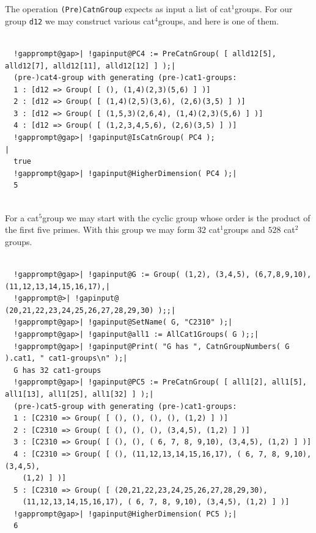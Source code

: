 \documentclass[a4paper,11pt]{report}
\begin{document}
{{{ The operation \texttt{(Pre)CatnGroup} expects as input a list of cat$^1$\texttt{}groups. For our group \texttt{d12} we may construct various cat$^4$\texttt{}groups, and here is one of them. 

 }

 

 
\begin{Verbatim}[commandchars=!@|,fontsize=\small,frame=single,label=Example]
  
  !gapprompt@gap>| !gapinput@PC4 := PreCatnGroup( [ alld12[5], alld12[7], alld12[11], alld12[12] ] );|
  (pre-)cat4-group with generating (pre-)cat1-groups:
  1 : [d12 => Group( [ (), (1,4)(2,3)(5,6) ] )]
  2 : [d12 => Group( [ (1,4)(2,5)(3,6), (2,6)(3,5) ] )]
  3 : [d12 => Group( [ (1,5,3)(2,6,4), (1,4)(2,3)(5,6) ] )]
  4 : [d12 => Group( [ (1,2,3,4,5,6), (2,6)(3,5) ] )]
  !gapprompt@gap>| !gapinput@IsCatnGroup( PC4 );                                             |
  true
  !gapprompt@gap>| !gapinput@HigherDimension( PC4 );|
  5
  
\end{Verbatim}
 For a cat$^5$\texttt{}group we may start with the cyclic group whose order is
the product of the first five primes. With this group we may form $32$ cat$^1$\texttt{}groups and $528$ cat$^2$\texttt{}groups. 

 
\begin{Verbatim}[commandchars=!@|,fontsize=\small,frame=single,label=Example]
  
  !gapprompt@gap>| !gapinput@G := Group( (1,2), (3,4,5), (6,7,8,9,10), (11,12,13,14,15,16,17),|
  !gapprompt@>| !gapinput@               (20,21,22,23,24,25,26,27,28,29,30) );;|
  !gapprompt@gap>| !gapinput@SetName( G, "C2310" );|
  !gapprompt@gap>| !gapinput@all1 := AllCat1Groups( G );;|
  !gapprompt@gap>| !gapinput@Print( "G has ", CatnGroupNumbers( G ).cat1, " cat1-groups\n" );|
  G has 32 cat1-groups
  !gapprompt@gap>| !gapinput@PC5 := PreCatnGroup( [ all1[2], all1[5], all1[13], all1[25], all1[32] ] );|
  (pre-)cat5-group with generating (pre-)cat1-groups:
  1 : [C2310 => Group( [ (), (), (), (), (1,2) ] )]
  2 : [C2310 => Group( [ (), (), (), (3,4,5), (1,2) ] )]
  3 : [C2310 => Group( [ (), (), ( 6, 7, 8, 9,10), (3,4,5), (1,2) ] )]
  4 : [C2310 => Group( [ (), (11,12,13,14,15,16,17), ( 6, 7, 8, 9,10), (3,4,5), 
    (1,2) ] )]
  5 : [C2310 => Group( [ (20,21,22,23,24,25,26,27,28,29,30), 
    (11,12,13,14,15,16,17), ( 6, 7, 8, 9,10), (3,4,5), (1,2) ] )]
  !gapprompt@gap>| !gapinput@HigherDimension( PC5 );|
  6
  
\end{Verbatim}
 }

 }
\end{document}

